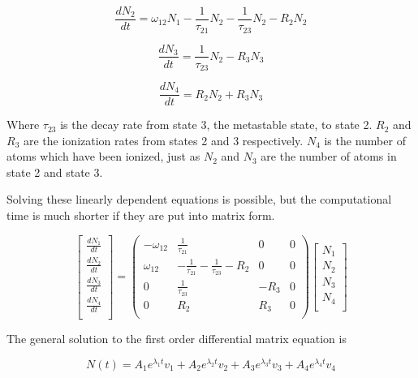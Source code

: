 \documentclass[prb,preprint]{revtex4-1}
\begin{document}
\begin{equation}
\label{RateEq2}
\frac{dN_2}{dt} = \omega_{12}N_1 -  \frac{1}{\tau_{21}}N_2 - \frac{1}{\tau_{23}}N_2 - R_2N_2
\end{equation}

\begin{equation}
\label{RateEq3}
\frac{dN_3}{dt} =  \frac{1}{\tau_{23}}N_2 - R_3N_3
\end{equation}

\begin{equation}
\label{RateEq4}
\frac{dN_4}{dt} = R_2N_2 + R_3N_3
\end{equation}

Where $\tau_{23}$ is the decay rate from state 3, the metastable state, to state 2. $R_2$ and $R_3$ are the ionization rates from states 2 and 3 respectively. $N_4$ is the number of atoms which have been ionized, just as $N_2$ and $N_3$ are the number of atoms in state 2 and state 3.

Solving these linearly dependent equations is possible, but the computational time is much shorter if they are put into matrix form.

\begin{equation}
\label{RateEqMatrix}
\begin{bmatrix}
	\frac{dN_1}{dt} \\
	\frac{dN_2}{dt} \\
	\frac{dN_3}{dt} \\
	\frac{dN_4}{dt} \\
\end{bmatrix}
=
\begin{pmatrix}
	-\omega_{12} & \frac{1}{\tau_{21}}  & 0 &  0   \\
	\omega_{12}  & -\frac{1}{\tau_{21}}- \frac{1}{\tau_{23}}-R_2 & 0 & 0 \\
	0  &  \frac{1}{\tau_{23}}  & - R_3 & 0 \\
	0  &  R_2  & R_3 & 0  \\
\end{pmatrix}
\begin{bmatrix}
	N_1 \\
	N_2 \\
	N_3 \\
	N_4 \\
\end{bmatrix}
\end{equation}

The general solution to the first order differential matrix equation is

\begin{equation}
\label{RateEqSol}
N(t) = A_1e^{\lambda_1 t} v_1 + A_2e^{\lambda_2 t} v_2 + A_3e^{\lambda_3 t} v_3 + A_4e^{\lambda_4 t} v_4 
\end{equation}
\end{document}
